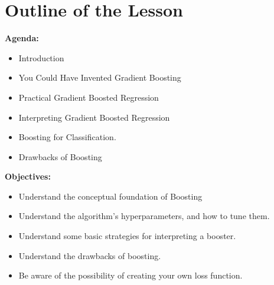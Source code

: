 \section{Outline of the Lesson}
%
\begin{frame}
\textbf{Agenda:}
 
  \begin{itemize}
    \item Introduction
    \item You Could Have Invented Gradient Boosting
    \item Practical Gradient Boosted Regression
    \item Interpreting Gradient Boosted Regression
    \item Boosting for Classification.
    \item Drawbacks of Boosting
  \end{itemize}

\end{frame}
%
\begin{frame}
\textbf{Objectives:}

  \begin{itemize}
    \item Understand the conceptual foundation of Boosting
    \item Understand the algorithm's hyperparameters, and how to tune them.
    \item Understand some basic strategies for interpreting a booster.
    \item Understand the drawbacks of boosting.
    \item Be aware of the possibility of creating your own loss function.
  \end{itemize}
  
\end{frame}